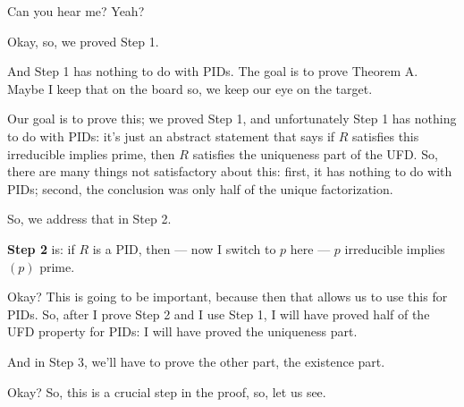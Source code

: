 \begin{speech}[00:45:19 - 00:47:07]
 Can you hear me? Yeah?

Okay, so, we proved Step 1.

And Step 1 has nothing to do with PIDs. The goal is to prove Theorem A. Maybe I keep that on the board so, we keep our eye on the target. 

Our goal is to prove this; we proved Step 1, and unfortunately Step 1 has nothing to do with PIDs: it's just an abstract statement that says if $R$ satisfies this irreducible implies prime, then $R$ satisfies the uniqueness part of the UFD. So, there are many things not satisfactory about this: first, it has nothing to do with PIDs; second, the conclusion was only half of the unique factorization.

So, we address that in Step 2.

\textbf{Step 2}  is: if $R$ is a PID,  then --- now I switch to $p$ here --- $p$ irreducible  implies  $(p)$ prime. 

Okay? This is going to be important, because then that allows us to use this for PIDs. So, after I prove Step 2 and I use Step 1, I will have proved half of the UFD property for PIDs: I will have proved the uniqueness part.

And in Step 3, we'll have to prove the other part, the existence part.

Okay? So, this is a crucial step in the proof, so, let us see.
\end{speech}

